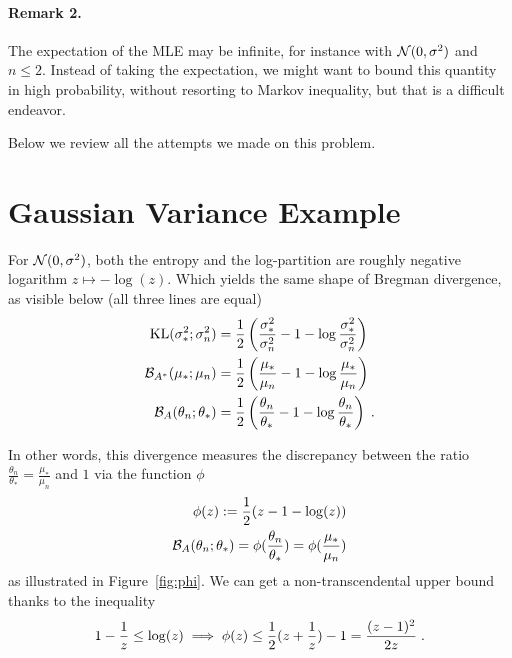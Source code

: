 \documentclass{article}
\newcommand{\logpart}{A}
\newcommand{\bregman}{\cB_\logpart}
\newcommand{\bregmanconj}{\cB_{\logpart^*}}
\newcommand{\nat}{\theta}
\begin{document}
\paragraph{Remark 2.}
The expectation of the MLE may be infinite, for instance with ${\mathcal N}(0,\sigma^2)$ and $n\leq 2$. Instead of taking the expectation,  we might want to bound this quantity in high probability, without resorting to Markov inequality, but that is a difficult endeavor.

Below we review all the attempts we made on this problem.

\tableofcontents

\section{Gaussian Variance Example}

\begin{example}
	For ${\mathcal N}(0,\sigma^2)$, both the entropy and the log-partition are roughly negative logarithm $z\mapsto - \log(z)$. Which yields the same shape of Bregman divergence, as visible below (all three lines are equal)
\begin{align}
	\KL( \sigma_*^2 ; \sigma_n^2 ) 
	&= \half \left ( \frac{\sigma_*^2}{ \sigma_n^2} - 1 - \log \frac{\sigma_*^2}{ \sigma_n^2} \right) \\
	\bregmanconj( \mu_*; \mu_n) 
	&= \half \left ( \frac{\mu_*}{ \mu_n} - 1 - \log  \frac{\mu_*}{ \mu_n} \right) \\
	\bregman( \nat_n; \nat_* ) 
	&=  \half \left ( \frac{ \nat_n}{\nat_*} - 1 - \log  \frac{ \nat_n}{\nat_*} \right) \; .
\end{align}
\end{example}
In other words, this divergence measures the discrepancy between the ratio $\frac{ \nat_n}{\nat_*} =  \frac{\mu_*}{ \mu_n}  $ and $1$ via the function $\phi$
\begin{align}
	\phi(z) := \half (z - 1 - \log(z)) \\
	\bregman( \nat_n; \nat_* )   = \phi(\frac{ \nat_n}{\nat_*}) =  \phi(\frac{\mu_*}{ \mu_n})
\end{align}
as illustrated in Figure~\ref{fig:phi}. We can get a non-transcendental upper bound thanks to the inequality
\begin{align}
	1 - \frac{1}{z} \leq \log(z) 
	\label{eq:log_bound} 
	\implies \phi(z) \leq \frac{1}{2} (z + \frac{1}{z}) - 1 = \frac{(z-1)^2}{2 z} \; .
\end{align}
\end{document}
